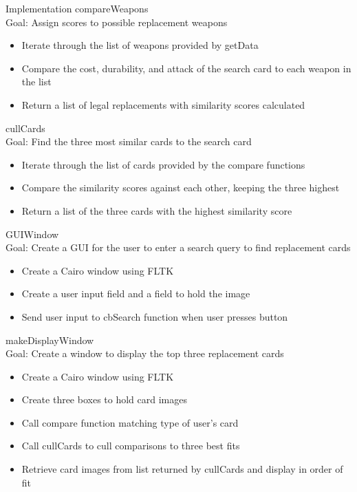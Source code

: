 \documentclass[aspectratio=169]{beamer}
\begin{document}
\begin{frame}[allowframebreaks]{Implementation}
compareWeapons\\
Goal: Assign scores to possible replacement weapons
\begin{itemize}
\item Iterate through the list of weapons provided by getData
\item Compare the cost, durability, and attack of the search card to each weapon
in the list
\item Return a list of legal replacements with similarity scores calculated
\end{itemize}
\pagebreak

cullCards \\
Goal: Find the three most similar cards to the search card
\begin{itemize}
\item Iterate through the list of cards provided by the compare functions
\item Compare the similarity scores against each other, keeping the three highest
\item Return a list of the three cards with the highest similarity score
\end{itemize}
\pagebreak

GUIWindow \\
Goal: Create a GUI for the user to enter a search query to find replacement cards
\begin{itemize}
\item Create a Cairo window using FLTK
\item Create a user input field and a field to hold the image
\item Send user input to cbSearch function when user presses button
\end{itemize}
\pagebreak

makeDisplayWindow \\
Goal: Create a window to display the top three replacement cards
\begin{itemize}
\item Create a Cairo window using FLTK
\item Create three boxes to hold card images
\item Call compare function matching type of user's card
\item Call cullCards to cull comparisons to three best fits
\item Retrieve card images from list returned by cullCards and display in order
of fit
\end{itemize}
\pagebreak


\end{frame}
\end{document}
